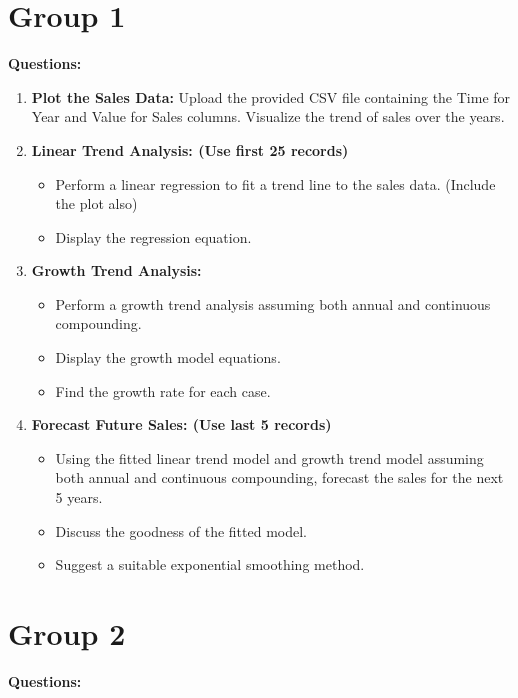 \documentclass{article}
\begin{document}
\section*{Group 1}

\textbf{Questions:}

\begin{enumerate}
    \item \textbf{Plot the Sales Data:} 
    Upload the provided CSV file containing the Time for Year and Value for Sales columns. Visualize the trend of sales over the years.

    \item \textbf{Linear Trend Analysis: (Use first 25 records)}
    \begin{itemize}
        \item Perform a linear regression to fit a trend line to the sales data. (Include the plot also)
        \item Display the regression equation.
    \end{itemize}

    \item \textbf{Growth Trend Analysis:}
    \begin{itemize}
        \item Perform a growth trend analysis assuming both annual and continuous compounding.
        \item Display the growth model equations.
        \item Find the growth rate for each case.
    \end{itemize}

    \item \textbf{Forecast Future Sales: (Use last 5 records)}
    \begin{itemize}
        \item Using the fitted linear trend model and growth trend model assuming both annual and continuous compounding, forecast the sales for the next 5 years.
        \item Discuss the goodness of the fitted model.
        \item Suggest a suitable exponential smoothing method.
    \end{itemize}
\end{enumerate}

\section*{Group 2}

\textbf{Questions:}
\end{document}
